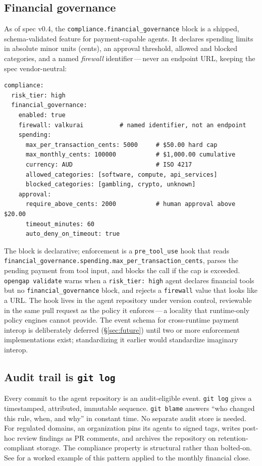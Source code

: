 \documentclass[11pt,a4paper]{article}
\begin{document}
\subsection{Financial governance}\label{sec:fingov}

As of spec v0.4, the \texttt{compliance.financial\_governance} block is a shipped,
schema-validated feature for payment-capable agents. It declares spending limits in
absolute minor units (cents), an approval threshold, allowed and blocked categories,
and a named \emph{firewall} identifier\,---\,never an endpoint URL, keeping the spec
vendor-neutral:

\begin{lstlisting}[language=yamlex]
compliance:
  risk_tier: high
  financial_governance:
    enabled: true
    firewall: valkurai          # named identifier, not an endpoint
    spending:
      max_per_transaction_cents: 5000     # $50.00 hard cap
      max_monthly_cents: 100000           # $1,000.00 cumulative
      currency: AUD                       # ISO 4217
      allowed_categories: [software, compute, api_services]
      blocked_categories: [gambling, crypto, unknown]
    approval:
      require_above_cents: 2000           # human approval above $20.00
      timeout_minutes: 60
      auto_deny_on_timeout: true
\end{lstlisting}

The block is declarative; enforcement is a \texttt{pre\_tool\_use} hook that reads
\texttt{financial\_governance.spending.max\_per\_transaction\_cents}, parses the pending
payment from tool input, and blocks the call if the cap is exceeded. \texttt{opengap
validate} warns when a \texttt{risk\_tier: high} agent declares financial tools but no
\texttt{financial\_governance} block, and rejects a \texttt{firewall} value that looks
like a URL. The hook lives in the agent repository under version control, reviewable in
the same pull request as the policy it enforces\,---\,a locality that runtime-only
policy engines cannot provide. The event schema for cross-runtime payment interop is
deliberately deferred (\S\ref{sec:future}) until two or more enforcement implementations
exist; standardizing it earlier would standardize imaginary interop.

\subsection{Audit trail is \texttt{git log}}

Every commit to the agent repository is an audit-eligible event. \texttt{git log}
gives a timestamped, attributed, immutable sequence. \texttt{git blame} answers
``who changed this rule, when, and why'' in constant time. No separate audit store is
needed. For regulated domains, an organization pins its agents to signed tags, writes
post-hoc review findings as PR comments, and archives the repository on
retention-compliant storage. The compliance property is structural rather than
bolted-on. See \cite{gitclose} for a worked example of this pattern applied to the
monthly financial close.
\end{document}
